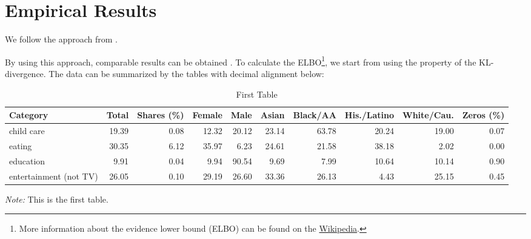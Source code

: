 \documentclass[11pt, letterpaper]{article}
\begin{document}
\lipsum[103] 

\section{Empirical Results}
We follow the approach from \cite{HL2019}. \lipsum[50] 

By using this approach, comparable results can be obtained \citep{CES2013}. To calculate the ELBO\footnote{More information about the evidence lower bound (ELBO) can be found on the \href{https://en.wikipedia.org/wiki/Evidence_lower_bound}{Wikipedia}. }, we start from using the property of the KL-divergence. The data can be summarized by the tables with decimal alignment below:

\renewcommand*\arraystretch{0.97}
\renewcommand{\tabcolsep}{2.5pt}
\begin{table}[H]
  \renewcommand{\thetable}{B.\arabic{table}a}
  \caption{First Table}
  \label{summary_a}
  \fontsize{10}{11}\selectfont
  \hspace*{-0.5cm}
  \begin{tabular}{lrrrrrrrrr}
    \toprule
    Category                   & Total & Shares (\%) & Female & Male  & Asian & Black/AA & His./Latino & White/Cau. & Zeros (\%) \\ \hline
    child care                 & 19.39 & 0.08   & 12.32  & 20.12 & 23.14 & 63.78    & 20.24       & 19.00      & 0.07  \\
    eating                     & 30.35 & 6.12   & 35.97  & 6.23 & 24.61 & 21.58    & 38.18       & 2.02      & 0.00  \\
    education                  & 9.91  & 0.04   & 9.94   & 90.54  & 9.69  & 7.99     & 10.64        & 10.14      & 0.90  \\
    entertainment (not TV)     & 26.05 & 0.10   & 29.19  & 26.60 & 33.36 & 26.13    & 4.43       & 25.15      & 0.45  \\ \bottomrule
  \end{tabular}
  \hspace*{-1cm}
  \begin{minipage}{1\textwidth}
    \onehalfspacing
    \vspace*{0.05cm}
    \begin{tablenotes}
      \footnotesize
      \item\textit{Note:} This is the first table.
    \end{tablenotes}
  \end{minipage}
\end{table}
\end{document}
